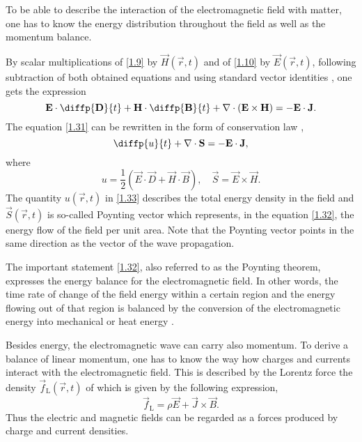 To be able to describe the interaction of the electromagnetic field with matter, one has to know the energy distribution throughout the field as well as the momentum balance.

By scalar multiplications of \ref{1.9} by $ \vec{H}\left( \vec{r}, t \right) $ and of \ref{1.10} by $ \vec{E}\left( \vec{r}, t \right) $, following subtraction of both obtained equations and using standard vector identities \cite{huba}, one gets the expression 
\begin{equation}
\label{1.31}
\vec{E} \cdot \diffp{\vec{D}}{t} + \vec{H} \cdot \diffp{\vec{B}}{t} + \div{\left(\vec{E} \times \vec{H} \right)} = -\vec{E} \cdot \vec{J}.
\end{equation}
The equation \ref{1.31} can be rewritten in the form of conservation law \cite{Jackson2005},
\begin{equation}
\label{1.32}
\diffp{u}{t} + \div{\vec{S}} = - \vec{E} \cdot \vec{J},
\end{equation}
where
\begin{equation}
\label{1.33}
u = \frac{1}{2} \left(\vec{E} \cdot \vec{D} + \vec{H} \cdot \vec{B} \right), \quad \vec{S} = \vec{E} \times \vec{H}.
\end{equation}
The quantity $ u\left( \vec{r}, t \right) $ in \ref{1.33} describes the total energy density in the field and $ \vec{S}\left( \vec{r}, t \right) $ is so-called Poynting vector which represents, in the equation \ref{1.32}, the energy flow of the field per unit area. Note that the Poynting vector points in the same direction as the vector of the wave propagation.

The important statement \ref{1.32}, also referred to as the Poynting theorem, expresses the energy balance for the electromagnetic field. In other words, the time rate of change of the field energy within a certain region and the energy flowing out of that region is balanced by the conversion of the electromagnetic energy into mechanical or heat energy \cite{Jackson2005}.

Besides energy, the electromagnetic wave can carry also momentum. To derive a balance of linear momentum, one has to know the way how charges and currents interact with the electromagnetic field. This is described by the Lorentz force the density $ \vec{f}_\mathrm{L} \left( \vec{r}, t \right) $ of which is given by the following expression,
\begin{equation}
\label{1.51}
\vec{f}_\mathrm{L} = \rho \vec{E} + \vec{J} \times \vec{B}.
\end{equation}
Thus the electric and magnetic fields can be regarded as a forces produced by charge and current densities.

